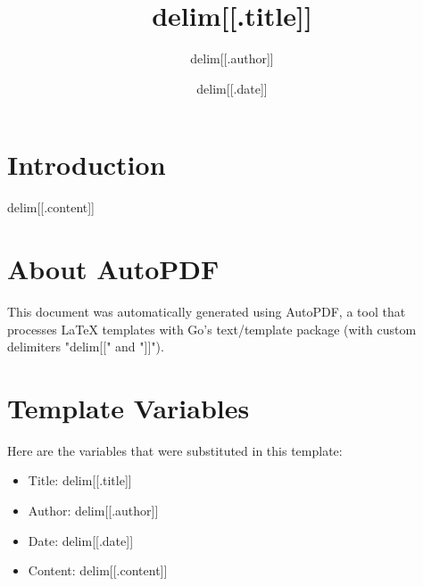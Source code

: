 \documentclass{article}
\title{delim[[.title]]}
\author{delim[[.author]]}
\date{delim[[.date]]}
\begin{document}
\maketitle

\section{Introduction}

delim[[.content]]

\section{About AutoPDF}

This document was automatically generated using AutoPDF, a tool that processes LaTeX
templates with Go's text/template package (with custom delimiters "delim[[" and "]]").

\section{Template Variables}

Here are the variables that were substituted in this template:

\begin{itemize}
    \item Title: delim[[.title]]
    \item Author: delim[[.author]]
    \item Date: delim[[.date]]
    \item Content: delim[[.content]]
\end{itemize}
\end{document}
